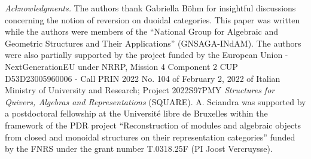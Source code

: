 \documentclass[nosumlimits,twoside]{amsart}
\theoremstyle{definition}
\theoremstyle{remark}
\begin{document}
\noindent\emph{Acknowledgments.}
The authors thank Gabriella B\"ohm for insightful discussions concerning the notion of reversion on duoidal categories.
This paper was written while the authors were members of the “National Group for Algebraic and Geometric Structures and Their Applications” (GNSAGA-INdAM). The authors were also partially supported by the project funded by the European Union -NextGenerationEU under NRRP, Mission 4 Component 2 CUP D53D23005960006 - Call PRIN 2022 No. 104 of February 2, 2022 of Italian Ministry of University and Research; Project 2022S97PMY \emph{Structures for Quivers, Algebras and Representations} (SQUARE).
A. Sciandra was supported by a postdoctoral fellowship at the Université libre de Bruxelles within the framework of the PDR project ``Reconstruction of modules and algebraic objects from closed and monoidal structures on their representation categories'' funded by the FNRS under the grant number T.0318.25F (PI Joost Vercruysse).







\end{document}
